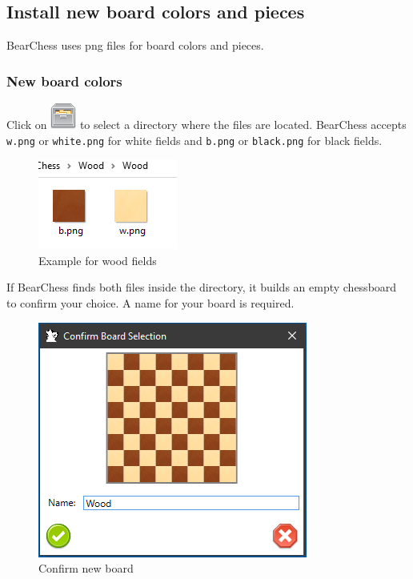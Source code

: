 \documentclass[11pt,a4paper]{article}
\begin{document}
	
	
	
	\subsection{Install new board colors and pieces}
	BearChess uses png files for board colors and pieces.
	
	\subsubsection{New board colors}
	Click on \includegraphics[scale=0.5]{file_manager.png} to select a directory where the files are located. BearChess accepts \verb|w.png| or \verb|white.png| for white fields and \verb|b.png| or \verb|black.png| for black fields.
	
	\begin{figure}[H]
		\centering
		\includegraphics[scale=1.0]{WoodPieces.png}
		\caption{Example for wood fields }
		\label{fig:WoodPieces}
	\end{figure}
	
	If BearChess finds both files inside the directory, it builds an empty chessboard to confirm your choice. A name for your board is required.
	
	\begin{figure}[H]
		\centering
		\includegraphics[scale=1.0]{ConfirmBoard.png}
		\caption{Confirm new board }
		\label{fig:ConfirmBoard}
	\end{figure}
	
\end{document}
